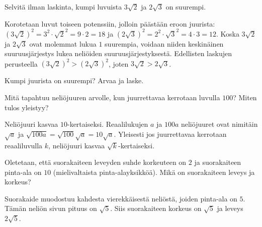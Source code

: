 \begin{tehtavasivu}
\begin{tehtava}
Selvitä ilman laskinta, kumpi luvuista $3\sqrt{2}$ ja $2\sqrt{3}$ on suurempi. 
        \begin{vastaus}
Korotetaan luvut toiseen potenssiin, jolloin päästään eroon juurista: $(3\sqrt{2})^2=3^2\cdot\sqrt{2}^2=9 \cdot 2=18$ ja $(2\sqrt{3})^2=2^2\cdot\sqrt{3}^2=4 \cdot 3=12$. Koska $3\sqrt{2}$ ja $2\sqrt{3}$ ovat molemmat lukua $1$ suurempia, voidaan niiden keskinäinen suuruusjärjestys lukea neliöiden suuruusjärjestyksestä. Edellisten laskujen perusteella $(3\sqrt{2})^2 > (2\sqrt{3})^2$, joten $3\sqrt{2} > 2\sqrt{3}$.
        \end{vastaus}
\end{tehtava}

\begin{tehtava} Kumpi juurista on suurempi? Arvaa ja laske.
\begin{vastaus}
\end{vastaus}
\end{tehtava}

\begin{tehtava}
Mitä tapahtuu neliöjuuren arvolle, kun juurrettavaa kerrotaan luvulla $100$? Miten tulos yleistyy?
        \begin{vastaus}
Neliöjuuri kasvaa $10$-kertaiseksi. Reaalilukujen $a$ ja $100a$ neliöjuuret ovat nimitäin $\sqrt{a}$ ja $\sqrt{100a}=\sqrt{100}\sqrt{a}=10\sqrt{a}$. Yleisesti jos juurrettavaa kerrotaan reaaliluvulla $k$, neliöjuuri kasvaa $\sqrt{k}$-kertaiseksi.
        \end{vastaus}
\end{tehtava}

\begin{tehtava}
Oletetaan, että suorakaiteen leveyden suhde korkeuteen on $2$ ja suorakaiteen pinta-ala on $10$ (mielivaltaista pinta-alayksikköä). Mikä on suorakaiteen leveys ja korkeus?
\begin{vastaus}
Suorakaide muodostuu kahdesta vierekkäisestä neliöstä, joiden pinta-ala on $5$. Tämän neliön sivun pituus on $\sqrt{5}$. Siis suorakaiteen korkeus on $\sqrt{5}$ ja leveys $2\sqrt{5}$.
\end{vastaus}
\end{tehtava}


\end{tehtavasivu}
